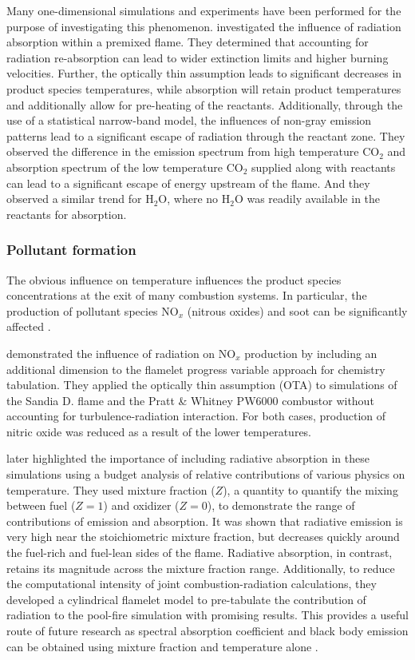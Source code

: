 Many one-dimensional simulations and experiments have been performed for the purpose of investigating this phenomenon.
\citet{Ju1998EffectsFlames} investigated the influence of radiation absorption within a premixed flame.
They determined that accounting for radiation re-absorption can lead to wider extinction limits and higher burning velocities. Further, the optically thin assumption leads to significant decreases in product species temperatures, while absorption will retain product temperatures and additionally allow for pre-heating of the reactants.
Additionally, through the use of a statistical narrow-band model, the influences of non-gray emission patterns lead to a significant escape of radiation through the reactant zone. They observed the difference in the emission spectrum from high temperature CO$_2$ and absorption spectrum of the low temperature CO$_2$ supplied along with reactants can lead to a significant escape of energy upstream of the flame. And they observed a similar trend for H$_2$O, where no H$_2$O was readily available in the reactants for absorption.

\subsubsection{Pollutant formation}
The obvious influence on temperature influences the product species concentrations at the exit of many combustion systems. In particular, the production of pollutant species NO$_x$ (nitrous oxides) and soot can be significantly affected \cite{Viskanta2010RadiativeSystems}.

\citet{Ihme2008ModelingFormulation} demonstrated the influence of radiation on NO$_x$ production by including an additional dimension to the flamelet progress variable approach for chemistry tabulation.
They applied the optically thin assumption (OTA) to simulations of the Sandia D. flame and the Pratt \& Whitney PW6000 combustor without accounting for turbulence-radiation interaction.
For both cases, production of nitric oxide was reduced as a result of the lower temperatures.

\citet{Wu2021LimitationsFires} later highlighted the importance of including radiative absorption in these simulations using a budget analysis of relative contributions of various physics on temperature. 
They used mixture fraction ($Z$), a quantity to quantify the mixing between fuel ($Z=1$) and oxidizer ($Z=0$), to demonstrate the range of contributions of emission and absorption.
It was shown that radiative emission is very high near the stoichiometric mixture fraction, but decreases quickly around the fuel-rich and fuel-lean sides of the flame. Radiative absorption, in contrast, retains its magnitude across the mixture fraction range.
Additionally, to reduce the computational intensity of joint combustion-radiation calculations, they developed a cylindrical flamelet model to pre-tabulate the contribution of radiation to the pool-fire simulation with promising results.
This provides a useful route of future research as spectral absorption coefficient and black body emission can be obtained using mixture fraction and temperature alone \cite{Viskanta2010RadiativeSystems}.

